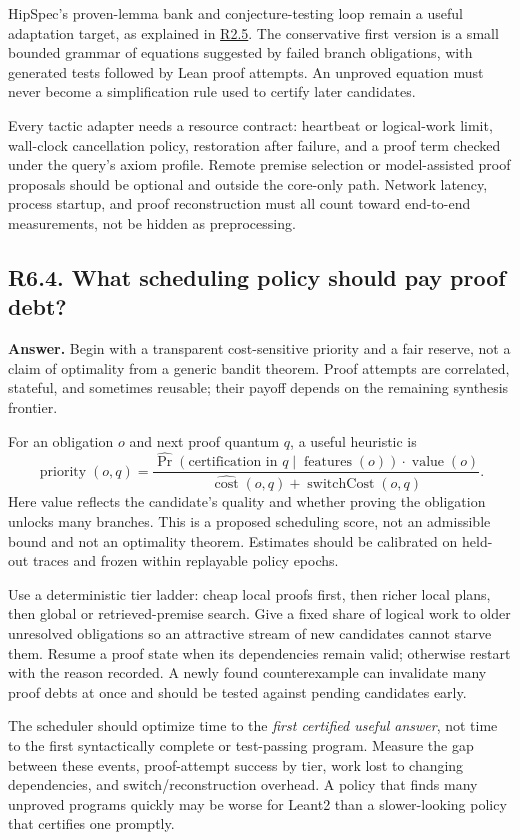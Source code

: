 \documentclass[11pt,a4paper]{article}
\newcommand{\question}[2]{\subsection{#1. #2}\label{q:#1}}
\newcommand{\qref}[1]{\hyperref[q:#1]{#1}}
\theoremstyle{definition}
\theoremstyle{remark}
\begin{document}
HipSpec's proven-lemma bank and conjecture-testing loop remain a useful adaptation target, as explained in \qref{R2.5}.\cite{hipspec} The conservative first version is a small bounded grammar of equations suggested by failed branch obligations, with generated tests followed by Lean proof attempts. An unproved equation must never become a simplification rule used to certify later candidates.

Every tactic adapter needs a resource contract: heartbeat or logical-work limit, wall-clock cancellation policy, restoration after failure, and a proof term checked under the query's axiom profile. Remote premise selection or model-assisted proof proposals should be optional and outside the core-only path. Network latency, process startup, and proof reconstruction must all count toward end-to-end measurements, not be hidden as preprocessing.

\question{R6.4}{What scheduling policy should pay proof debt?}

\textbf{Answer.} Begin with a transparent cost-sensitive priority and a fair reserve, not a claim of optimality from a generic bandit theorem. Proof attempts are correlated, stateful, and sometimes reusable; their payoff depends on the remaining synthesis frontier.

For an obligation $o$ and next proof quantum $q$, a useful heuristic is
\[
 \operatorname{priority}(o,q)=
 \frac{\widehat{\Pr}(\text{certification in }q\mid\operatorname{features}(o))
       \cdot\operatorname{value}(o)}
      {\widehat{\operatorname{cost}}(o,q)+\operatorname{switchCost}(o,q)}.
\]
Here value reflects the candidate's quality and whether proving the obligation unlocks many branches. This is a proposed scheduling score, not an admissible bound and not an optimality theorem. Estimates should be calibrated on held-out traces and frozen within replayable policy epochs.

Use a deterministic tier ladder: cheap local proofs first, then richer local plans, then global or retrieved-premise search. Give a fixed share of logical work to older unresolved obligations so an attractive stream of new candidates cannot starve them. Resume a proof state when its dependencies remain valid; otherwise restart with the reason recorded. A newly found counterexample can invalidate many proof debts at once and should be tested against pending candidates early.

The scheduler should optimize time to the \emph{first certified useful answer}, not time to the first syntactically complete or test-passing program. Measure the gap between these events, proof-attempt success by tier, work lost to changing dependencies, and switch/reconstruction overhead. A policy that finds many unproved programs quickly may be worse for Leant2 than a slower-looking policy that certifies one promptly.
\end{document}
